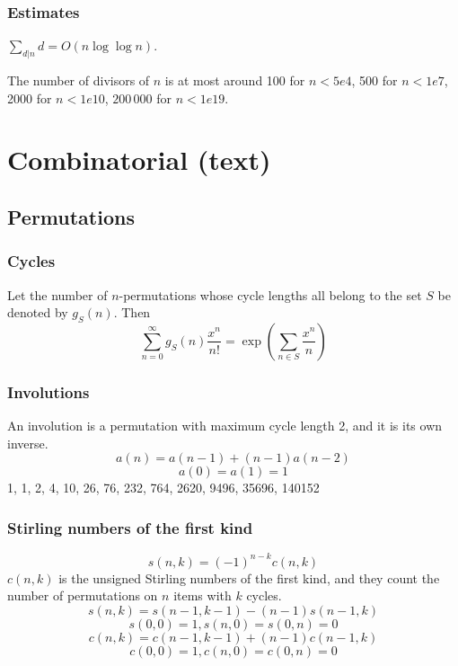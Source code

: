 {\subsection{Estimates}
	$\sum_{d|n} d = O(n \log \log n)$.

	The number of divisors of $n$ is at most around 100 for $n < 5e4$, 500 for $n < 1e7$, 2000 for $n < 1e10$, $200\,000$ for $n < 1e19$.

\chapter{Combinatorial (text)}

%	

\section{Permutations}
%	

\subsection{Cycles}
	Let the number of $n$-permutations whose cycle lengths all belong to the set $S$ be denoted by $g_S(n)$. Then
	$$\sum_{n=0} ^\infty g_S(n) \frac{x^n}{n!} = \exp\left(\sum_{n\in S} \frac{x^n} {n} \right)$$

\subsection{Involutions}
	An involution is a permutation with maximum cycle length 2, and it is its own inverse.
	$$a(n) = a(n-1) + (n-1)a(n-2)$$
	$$a(0) = a(1) = 1$$
	1, 1, 2, 4, 10, 26, 76, 232, 764, 2620, 9496, 35696, 140152

\subsection{Stirling numbers of the first kind}
	$$s(n,k) = (-1)^{n-k}c(n,k)$$
	$c(n,k)$ is the unsigned Stirling numbers of the first kind, and they count the number of permutations on $n$ items with $k$ cycles.
	$$s(n,k) = s(n-1,k-1) - (n-1) s(n-1,k)$$
	$$s(0,0) = 1, s(n,0) = s(0,n) = 0$$
	$$c(n,k) = c(n-1,k-1) + (n-1) c(n-1,k)$$
	$$c(0,0) = 1, c(n,0)=c(0,n)=0$$

}

